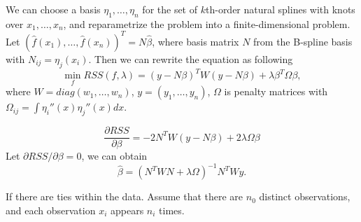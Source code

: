 \begin{solution}
    We can choose a basis $\eta_1, \dots, \eta_n$ for the set of $k$th-order natural splines with knots over $x_1, \dots, x_n$, 
    and reparametrize the problem into a finite-dimensional problem. 
    Let $(\hat{f}(x_1), \dots, \hat{f}(x_n))^T = N \hat{\beta}$, where basis matrix $N$ from the B-spline basis with $N_{ij} = \eta_{j} (x_i)$. 
    Then we can rewrite the equation as following
    \begin{equation*}
        \min_f RSS(f, \lambda) =  (y - N \beta)^T W (y - N \beta)  + \lambda \beta^T \Omega \beta,
    \end{equation*}
    where $W=diag(w_1, \dots, w_n)$, $y=(y_1, \dots, y_n)$, $\Omega$ is penalty matrices with $\Omega_{ij} = \int \eta_i''(x) \eta_j''(x) dx$. 

    
    \begin{equation*}
        \frac{\partial RSS}{\partial \beta} = - 2 N^T W (y-N\beta) + 2 \lambda \Omega \beta
    \end{equation*}
    Let $\partial RSS/ \partial \beta = 0$, we can obtain
    \begin{equation*}
        \hat{\beta} = (N^T W N + \lambda \Omega)^{-1} N^T W y.
    \end{equation*}

    If there are ties within the data. Assume that there are $n_0$ distinct observations, and each observation $x_i$ appears $n_i$ times. 


\end{solution}
